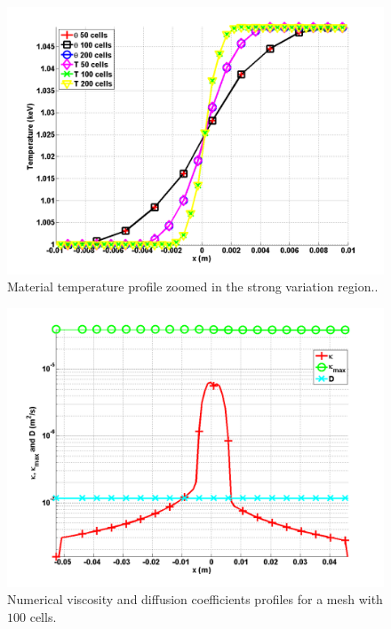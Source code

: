 \documentclass[review]{elsarticle}
\begin{document}
\begin{figure}[H]
        \centering
        \includegraphics[width=\textwidth]{Mach_1p05_zoom_in_temperatures.png}
        \caption{Material temperature profile zoomed in the strong variation region..}
        \label{fig:Mach_1p05_frozen_temp}
\end{figure}        
\begin{figure}[H]
        \centering
        \includegraphics[width=\textwidth]{Mach_1p05_frozen_in_viscosity_coeffs.png}
        \caption{Numerical viscosity and diffusion coefficients profiles for a mesh with $100$ cells.}
        \label{fig:Mach_1p05_frozen_visc}
\end{figure}
\end{document}
